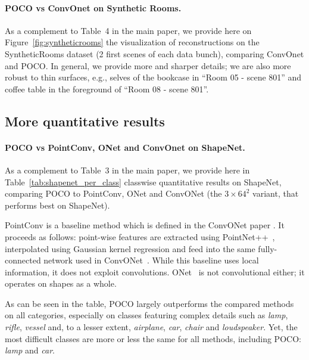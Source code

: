 \documentclass[10pt,twocolumn,letterpaper]{article}
\newcommand\OURS{{POCO}}
\begin{document}
\paragraph{{\OURS} vs ConvOnet on Synthetic Rooms.}
As a complement to Table~4 in the main paper, we provide here on Figure~\ref{fig:syntheticrooms} the visualization of reconstructions on the SyntheticRooms dataset (2 first scenes of each data bunch), comparing ConvOnet and {\OURS}. In general, we provide more and sharper details; we are also more robust to thin surfaces, e.g., selves of the bookcase in ``Room 05 - scene 801'' and coffee table in the foreground of ``Room 08 - scene 801''.

\subsection{More quantitative results}

\paragraph{{\OURS} vs PointConv, ONet and ConvOnet on ShapeNet.}
As a complement to Table~3 in the main paper, we provide here in Table~\ref{tab:shapenet_per_class} classwise quantitative results on ShapeNet, comparing {\OURS} to PointConv, ONet and ConvONet (the $3 \times 64^2$ variant, that performs best on ShapeNet).

PointConv is a baseline method which is defined in the ConvONet paper \cite{Peng2020ECCV}. It proceeds as follows: point-wise features are extracted using PointNet++~\cite{Qi2017NIPS}, interpolated using Gaussian kernel regression and feed into the same fully-connected network used in ConvONet~\cite{Peng2020ECCV}. While this baseline uses local information, it does not exploit convolutions. ONet~\cite{Mescheder2019CVPR} is not convolutional either; it operates on shapes as a whole.

As can be seen in the table, {\OURS} largely outperforms the compared methods on all categories, especially on classes featuring complex details such as \emph{lamp}, \emph{rifle}, \emph{vessel} and, to a lesser extent, \emph{airplane}, \emph{car}, \emph{chair} and \emph{loudspeaker}. Yet, the most difficult classes are more or less the same for all methods, including {\OURS}: \emph{lamp} and \emph{car}. 


\FloatBarrier
\end{document}
